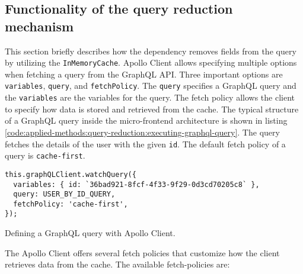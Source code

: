 \subsection{Functionality of the query reduction mechanism}\label{subsection:applied-methods:query-reduction:how-does-the-library-work}

This section briefly describes how the dependency removes fields from the query by utilizing the \texttt{InMemoryCache}. Apollo Client allows specifying multiple options when fetching a query from the GraphQL \ac{API}. Three important options are \texttt{variables}, \texttt{query}, and \texttt{fetchPolicy}. The \texttt{query} specifies a GraphQL query and the \texttt{variables} are the variables for the query. The fetch policy allows the client to specify how data is stored and retrieved from the cache. The typical structure of a GraphQL query inside the micro-frontend architecture is shown in listing \ref{code:applied-methods:query-reduction:executing-graphql-query}. The query fetches the details of the user with the given \texttt{id}. The default fetch policy of a query is \texttt{cache-first}.

\ifshowListings
\begin{listing}[H]
\begin{verbatim}
this.graphQLClient.watchQuery({
  variables: { id: `36bad921-8fcf-4f33-9f29-0d3cd70205c8` },
  query: USER_BY_ID_QUERY,
  fetchPolicy: 'cache-first',
});
\end{verbatim}
\caption{Defining a GraphQL query with Apollo Client.}\label{code:applied-methods:query-reduction:executing-graphql-query}
\end{listing}
\fi

\noindent The Apollo Client offers several fetch policies that customize how the client retrieves data from the cache. The available fetch-policies are: \cite{misc:-:applied-methods:query-reduction:apollo-client:queries}

